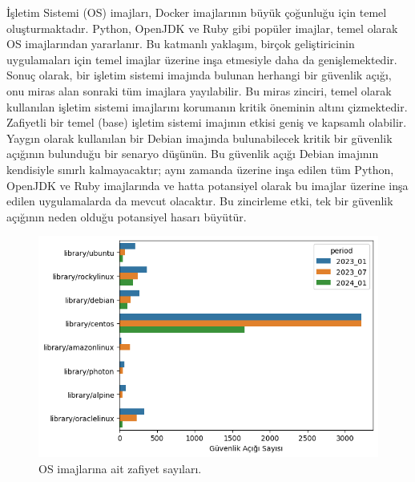 İşletim Sistemi (OS) imajları, Docker imajlarının büyük çoğunluğu için temel oluşturmaktadır. Python, OpenJDK ve Ruby gibi popüler imajlar, temel olarak OS imajlarından yararlanır. Bu katmanlı yaklaşım, birçok geliştiricinin uygulamaları için temel imajlar üzerine inşa etmesiyle daha da genişlemektedir. Sonuç olarak, bir işletim sistemi imajında bulunan herhangi bir güvenlik açığı, onu miras alan sonraki tüm imajlara yayılabilir. Bu miras zinciri, temel olarak kullanılan işletim sistemi imajlarını korumanın kritik öneminin altını çizmektedir. Zafiyetli bir temel (base) işletim sistemi imajının etkisi geniş ve kapsamlı olabilir. Yaygın olarak kullanılan bir Debian imajında bulunabilecek kritik bir güvenlik açığının bulunduğu bir senaryo düşünün. Bu güvenlik açığı Debian imajının kendisiyle sınırlı kalmayacaktır; aynı zamanda üzerine inşa edilen tüm Python, OpenJDK ve Ruby imajlarında ve hatta potansiyel olarak bu imajlar üzerine inşa edilen uygulamalarda da mevcut olacaktır. Bu zincirleme etki, tek bir güvenlik açığının neden olduğu potansiyel hasarı büyütür.

\begin{figure}[!htbp]
    \centering
    \includegraphics[width=1\linewidth]{images/s2/os-images-by-period.png}
    \caption{OS imajlarına ait zafiyet sayıları.}\label{fig:os-images-by-period}
\end{figure}

